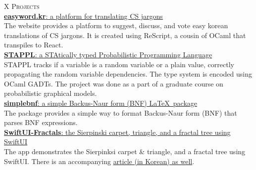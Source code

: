 \documentclass[a4paper,10pt]{memoir}
\begin{document}
\begin{tblr}{X}
  {\Large\textsc{Projects}}                                                                                                                                                                                                                                                                    \\ \hline
  \href{https://easyword.kr/}{\textbf{easyword.kr}: a platform for translating CS jargons}                                                                                                                                                                                                    \\
  The website provides a platform to suggest, discuss, and vote easy korean translations of CS jargons. It is created using ReScript, a cousin of OCaml that transpiles to React. \\[0.5\onelineskip]

  \href{https://github.com/Zeta611/stappl}{\textbf{STAPPL}: a STAtically typed Probabilistic Programming Language}                                                                                                                                                                                                    \\
  STAPPL tracks if a variable is a random variable or a plain value, correctly propagating the random variable dependencies.
  The type system is encoded using OCaml GADTs.
  The project was done as a part of a graduate course on probabilistic graphical models. \\[0.5\onelineskip]

  \href{https://github.com/Zeta611/simplebnf}{\textbf{simplebnf}: a simple Backus-Naur form (BNF) \LaTeX\ package}                                                                                                                                                                               \\
  The package provides a simple way to format Backus-Naur form (BNF) that parses BNF expressions. \\[0.5\onelineskip]

  \href{https://github.com/Zeta611/SwiftUI-Fractals}{\textbf{SwiftUI-Fractals}: the Sierpinski carpet, triangle, and a fractal tree using SwiftUI}                                                                                                                                             \\
  The app demonstrates the Sierpinksi carpet \& triangle, and a fractal tree using SwiftUI. There is an accompanying \href{https://zetablog.io/posts/fractals-in-swiftui}{article (in Korean) as well}. \\[0.5\onelineskip]


\end{tblr}
\end{document}

